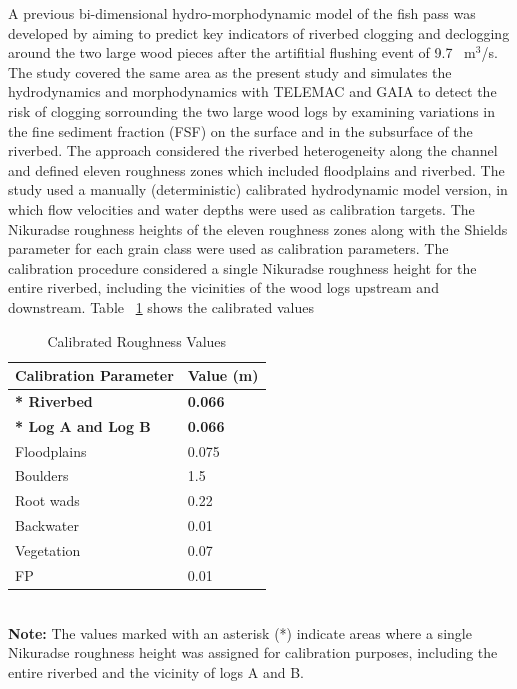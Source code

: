 \documentclass[draft,linenumbers,onecolumn]{agujournal2019} %
\begin{document}
A previous bi-dimensional hydro-morphodynamic model of the fish pass was developed by aiming to predict key indicators of riverbed clogging and declogging around the two large wood pieces after the artifitial flushing event of 9.7 ~m$^3$/s. The study covered the same area as the present study and simulates the hydrodynamics and morphodynamics with TELEMAC and GAIA to detect the risk of clogging sorrounding the two large wood logs by examining variations in the fine sediment fraction (FSF) on the surface and in the subsurface of the riverbed.
The approach considered the riverbed heterogeneity along the channel and defined eleven roughness zones which included floodplains and riverbed. The study used a manually (deterministic) calibrated hydrodynamic model version, in which flow velocities and water depths were used as calibration targets. The Nikuradse roughness heights of the eleven roughness zones along with the Shields parameter for each grain class were used as calibration parameters. The calibration procedure considered a single Nikuradse roughness height for the entire riverbed, including the vicinities of the wood logs upstream and downstream. Table ~\ref{tab:calibrated_roughness} shows the calibrated values 

\begin{table}[H]
	\centering
	\caption{Calibrated Roughness Values}
	\begin{tabular}{p{6cm} p{4cm}}
		\hline
		\multicolumn{1}{c}{\textbf{Calibration Parameter}} & \multicolumn{1}{c}{\textbf{Value (m)}} \\ \hline
		\textbf{* Riverbed}  & \textbf{0.066} \\ 
		\textbf{* Log A and Log B} & \textbf{0.066} \\ 
		Floodplains & 0.075 \\ 
		Boulders & 1.5 \\ 
		Root wads & 0.22 \\ 
		Backwater & 0.01 \\ 
		Vegetation & 0.07 \\ 
		FP & 0.01 \\ \hline
	\end{tabular}
	\label{tab:calibrated_roughness}\\
	\textbf{Note:} The values marked with an asterisk (*) indicate areas where a single Nikuradse roughness height was assigned for calibration purposes, including the entire riverbed and the vicinity of logs A and B.
\end{table}
\end{document}
